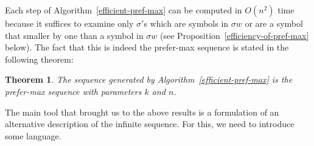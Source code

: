 \documentclass{article}
\newtheorem{theorem}{Theorem}
\theoremstyle{definition}
\begin{document}
Each step of Algorithm~\ref{efficient-pref-max} can be computed in $O(n^2)$ time because it suffices to examine only $\sigma'$s which are symbols in $\sigma w$ or are a symbol that smaller by one than a symbol in $\sigma w$ (see Proposition~\ref{efficiency-of-pref-max} below).
The fact that this is indeed the prefer-max sequence is stated in the following theorem:

\begin{theorem}
	The sequence generated by Algorithm~\ref{efficient-pref-max} is the prefer-max sequence with parameters $k$ and $n$.
\end{theorem}
	

The main tool that brought us to the above results is a formulation of an alternative description of the infinite sequence. For this, we need to introduce some language.


	
\end{document}
